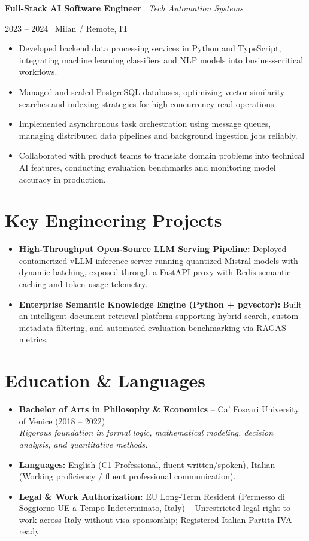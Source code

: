 \documentclass[a4paper,10pt]{article}
\newcommand{\role}[4]{%
  \vspace{2pt}\noindent
  \begin{minipage}[t]{0.70\textwidth}\raggedright\textbf{#1} \textbullet\ \textit{#3}\end{minipage}%
  \hfill
  \begin{minipage}[t]{0.28\textwidth}\raggedleft\footnotesize\color{gray}#2 \textbullet\ #4\end{minipage}%
  \vspace{1pt}%
}
\begin{document}
\vspace{3pt}
\role{Full-Stack AI Software Engineer}{2023 -- 2024}{Tech Automation Systems}{Milan / Remote, IT}
\begin{itemize}
  \item Developed backend data processing services in Python and TypeScript, integrating machine learning classifiers and NLP models into business-critical workflows.
  \item Managed and scaled PostgreSQL databases, optimizing vector similarity searches and indexing strategies for high-concurrency read operations.
  \item Implemented asynchronous task orchestration using message queues, managing distributed data pipelines and background ingestion jobs reliably.
  \item Collaborated with product teams to translate domain problems into technical AI features, conducting evaluation benchmarks and monitoring model accuracy in production.
\end{itemize}

\section{Key Engineering Projects}
\begin{itemize}
  \item \textbf{High-Throughput Open-Source LLM Serving Pipeline:} Deployed containerized vLLM inference server running quantized Mistral models with dynamic batching, exposed through a FastAPI proxy with Redis semantic caching and token-usage telemetry.
  \item \textbf{Enterprise Semantic Knowledge Engine (Python + pgvector):} Built an intelligent document retrieval platform supporting hybrid search, custom metadata filtering, and automated evaluation benchmarking via RAGAS metrics.
\end{itemize}

\section{Education \& Languages}
\begin{itemize}
  \item \textbf{Bachelor of Arts in Philosophy \& Economics} -- Ca' Foscari University of Venice (2018 -- 2022) \\
  \textit{Rigorous foundation in formal logic, mathematical modeling, decision analysis, and quantitative methods.}
  \item \textbf{Languages:} English (C1 Professional, fluent written/spoken), Italian (Working proficiency / fluent professional communication).
  \item \textbf{Legal \& Work Authorization:} EU Long-Term Resident (Permesso di Soggiorno UE a Tempo Indeterminato, Italy) -- Unrestricted legal right to work across Italy without visa sponsorship; Registered Italian Partita IVA ready.
\end{itemize}
\end{document}
